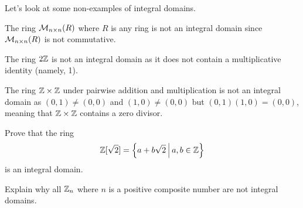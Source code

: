 Let's look at some non-examples of integral domains.
\begin{example}
    The ring $\mathcal{M}_{n\times n}(R)$ where $R$ is any ring is not an integral domain since $\mathcal{M}_{n\times n}(R)$ is not commutative.
\end{example}
\begin{example}
    The ring $2\mathbb{Z}$ is not an integral domain as it does not contain a multiplicative identity (namely, 1).
\end{example}
\begin{example}
    The ring $\mathbb{Z} \times \mathbb{Z}$ under pairwise addition and multiplication is not an integral domain as $(0,1) \neq (0, 0)$ and $(1, 0) \neq (0, 0)$ but $(0,1)(1,0) = (0, 0)$, meaning that $\mathbb{Z} \times \mathbb{Z}$ contains a zero divisor.
\end{example}

\begin{exercise}
    Prove that the ring
    \[
        \Z[\sqrt2] = \left\{a + b\sqrt2 \vert a,b \in \Z\right\}
    \]
    is an integral domain.
\end{exercise}
\begin{exercise}
    Explain why all $\mathbb{Z}_{n}$ where $n$ is a positive composite number are not integral domains.
\end{exercise}

